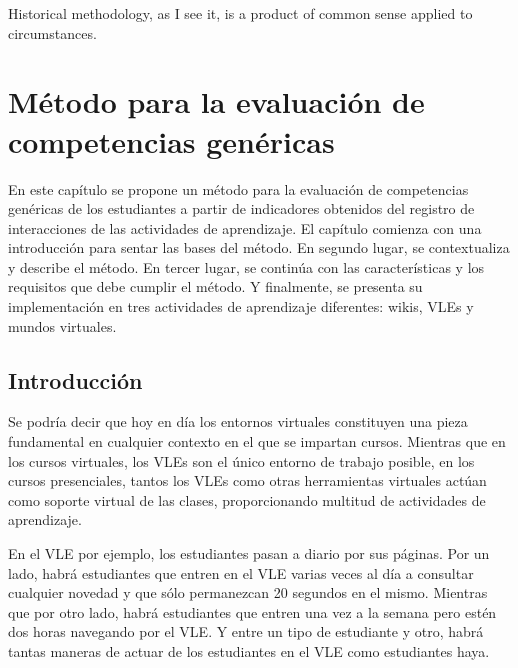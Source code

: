 

\begin{savequote}[50mm]
Historical methodology, as I see it, is a product of common sense applied to circumstances. 
\end{savequote}


\chapter{Método para la evaluación de competencias genéricas}
\label{cha:Overall methodology}

\ifpdf
    \graphicspath{{4_overall_methodology/figures/PNG/}{4_overall_methodology/figures/PDF/}{4_overall_methodology/figures/}}
\else
    \graphicspath{{4_overall_methodology/figures/EPS/}{4_overall_methodology/figures/}}
\fi



En este capítulo se propone un método para la evaluación de competencias genéricas de los estudiantes a partir de indicadores obtenidos del registro de interacciones de las actividades de aprendizaje. El capítulo comienza con una introducción para sentar las bases del método. En segundo lugar, se contextualiza y describe el método. En tercer lugar, se continúa con las características y los requisitos que debe cumplir el método. Y finalmente, se presenta su implementación en tres actividades de aprendizaje diferentes: wikis, VLEs y mundos virtuales.

\section{Introducción}

Se podría decir que hoy en día los entornos virtuales constituyen una pieza fundamental en cualquier contexto en el que se impartan cursos. Mientras que en los cursos virtuales, los VLEs son el único entorno de trabajo posible, en los cursos presenciales, tantos los VLEs como otras herramientas virtuales actúan como soporte virtual de las clases, proporcionando multitud de actividades de aprendizaje. 

En el VLE por ejemplo, los estudiantes pasan a diario por sus páginas. Por un lado, habrá estudiantes que entren en el VLE varias veces al día a consultar cualquier novedad y que sólo permanezcan 20 segundos en el mismo. Mientras que por otro lado, habrá estudiantes que entren una vez a la semana pero estén dos horas navegando por el VLE. Y entre un tipo de estudiante y otro, habrá tantas maneras de actuar de los estudiantes en el VLE como estudiantes haya. 


